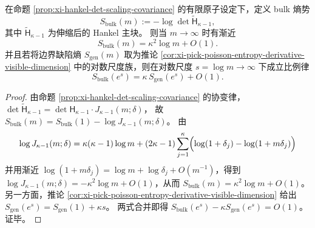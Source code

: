 
\begin{corollary}\label{cor:xi-bulk-boundary-double-scaling-holography}
在命题 \ref{prop:xi-hankel-det-scaling-covariance} 的有限原子设定下，定义 bulk 熵势
\[
S_{\mathrm{bulk}}(m):=-\log\det \widetilde{\mathsf H}_{\kappa-1},
\]
其中 \(\widetilde{\mathsf H}_{\kappa-1}\) 为伸缩后的 Hankel 主块。
则当 \(m\to\infty\) 时有渐近
\[
\boxed{\;
S_{\mathrm{bulk}}(m)=\kappa^2\log m+O(1).\;}
\]
并且若将边界缺陷熵 \(S_{\mathrm{gen}}(m)\) 取为推论 \ref{cor:xi-pick-poisson-entropy-derivative-visible-dimension} 中的对数尺度族，则在对数尺度 \(s=\log m\to\infty\) 下成立比例律
\[
\boxed{\;
S_{\mathrm{bulk}}(e^{s})=\kappa\,S_{\mathrm{gen}}(e^{s})+O(1).\;}
\]
\end{corollary}
\begin{proof}
由命题 \ref{prop:xi-hankel-det-scaling-covariance} 的协变律，
\(
\det \widetilde{\mathsf H}_{\kappa-1}=\det \mathsf H_{\kappa-1}\cdot J_{\kappa-1}(m;\delta)
\)，
故
\(
S_{\mathrm{bulk}}(m)=S_{\mathrm{bulk}}(1)-\log J_{\kappa-1}(m;\delta)
\)。
由
\[
\log J_{\kappa-1}(m;\delta)
=\kappa(\kappa-1)\log m
+(2\kappa-1)\sum_{j=1}^{\kappa}\Bigl(\log(1+\delta_j)-\log(1+m\delta_j)\Bigr)
\]
并用渐近 \(\log(1+m\delta_j)=\log m+\log\delta_j+O(m^{-1})\)，得到
\(
\log J_{\kappa-1}(m;\delta)=-\kappa^2\log m+O(1)
\)，从而
\(
S_{\mathrm{bulk}}(m)=\kappa^2\log m+O(1)
\)。
另一方面，推论 \ref{cor:xi-pick-poisson-entropy-derivative-visible-dimension} 给出
\(
S_{\mathrm{gen}}(e^s)=S_{\mathrm{gen}}(1)+\kappa s
\)。
两式合并即得
\(
S_{\mathrm{bulk}}(e^s)-\kappa S_{\mathrm{gen}}(e^s)=O(1)
\)。证毕。
\end{proof}

